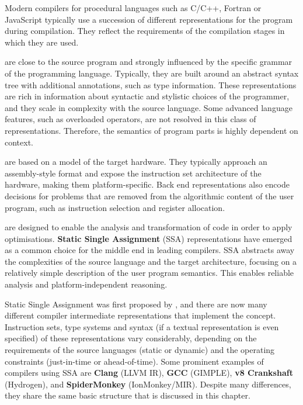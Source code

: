     Modern compilers for procedural languages such as
    C/C++, Fortran or JavaScript typically use a succession of different
    representations for the program during compilation.
    They reflect the requirements of the compilation stages in which they are
    used.

    \begin{description}[style=unboxed,leftmargin=0cm,labelindent=\parindent]
    \item[Front end representations] are close to the source program and
    strongly influenced by the specific grammar of the programming language.
    Typically, they are built around an abstract syntax tree with additional
    annotations, such as type information.
    These representations are rich in information about syntactic and stylistic
    choices of the programmer, and they scale in complexity with the source
    language.
    Some advanced language features, such as overloaded operators, are not
    resolved in this class of representations.
    Therefore, the semantics of program parts is highly dependent on context.

    \item[\bf Back end representations] are based on a model of the target
    hardware.
    They typically approach an assembly-style format and expose the instruction
    set architecture of the hardware, making them platform-specific.
    Back end representations also encode decisions for problems that are removed
    from the algorithmic content of the user program, such as instruction
    selection and register allocation.

    \item[\bf Middle end representations] are designed to enable the analysis
    and transformation of code in order to apply optimisations.
    {\bf Static Single Assignment} (SSA) representations have emerged as a
    common choice for the middle end in leading compilers.
    SSA abstracts away the complexities of the source language and the
    target architecture, focusing on a relatively simple description of the
    user program semantics.
    This enables reliable analysis and platform-independent reasoning.
    \end{description}

    Static Single Assignment was first proposed by
    \citet{Rosen:1988:GVN:73560.73562}, and there are now many different
    compiler intermediate representations that implement the concept.
    Instruction sets, type systems and syntax
    (if a textual representation is even specified) of these representations
    vary considerably, depending on the requirements of the source languages
    (static or dynamic) and the operating constraints
    (just-in-time or ahead-of-time).
    Some prominent examples of compilers using SSA are
    {\bf Clang} (LLVM IR), {\bf GCC} (GIMPLE), {\bf v8 Crankshaft} (Hydrogen),
    and {\bf SpiderMonkey} (IonMonkey/MIR).
    Despite many differences, they share the same basic structure that is
    discussed in this chapter.

